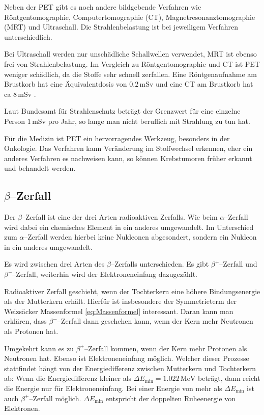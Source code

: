 \documentclass[12pt,a4paper]{scrartcl}
\numberwithin{equation}{section} %
\newcommand{\pu}[1]{\ensuremath{\mathrm{#1}}}
\begin{document}
Neben der PET gibt es noch andere bildgebende Verfahren wie Röntgentomographie, Computertomographie (CT), Magnetresonanztomographie (MRT) und Ultraschall. Die Strahlenbelastung ist bei jeweiligem Verfahren unterschiedlich.

Bei Ultraschall werden nur unschädliche Schallwellen verwendet, MRT ist ebenso frei von Strahlenbelastung. Im Vergleich zu Röntgentomographie und CT ist PET weniger schädlich, da die Stoffe sehr schnell zerfallen. Eine Röntgenaufnahme am Brustkorb hat eine Äquivalentdosis von $\pu{0.2 \,mSv}$ und eine CT am Brustkorb hat ca $\pu{8 \,mSv}$ \cite{SSK}.

Laut Bundesamt für Strahlenschutz beträgt der Grenzwert für eine einzelne Person $\pu{1 \,mSv}$ pro Jahr, so lange man nicht beruflich mit Strahlung zu tun hat.

Für die Medizin ist PET ein hervorragendes Werkzeug, besonders in der Onkologie. Das Verfahren kann Veränderung im Stoffwechsel erkennen, eher ein anderes Verfahren es nachweisen kann, so können Krebstumoren früher erkannt und behandelt werden.

\hypertarget{betazerfall}{%
\subsection{\texorpdfstring{$\beta$--Zerfall}{\textbackslash beta--Zerfall}}\label{betazerfall}}

Der $\beta$--Zerfall ist eine der drei Arten radioaktiven Zerfalls. Wie beim $\alpha$--Zerfall wird dabei ein chemisches Element in ein anderes umgewandelt. Im Unterschied zum $\alpha$--Zerfall werden hierbei keine Nukleonen abgesondert, sondern ein Nukleon in ein anderes umgewandelt.

Es wird zwischen drei Arten des $\beta$--Zerfalls unterschieden. Es gibt $\beta^+$--Zerfall und $\beta^-$--Zerfall, weiterhin wird der Elektroneneinfang dazugezählt.

Radioaktiver Zerfall geschieht, wenn der Tochterkern eine höhere Bindungsenergie als der Mutterkern erhält. Hierfür ist insbesondere der Symmetrieterm der Weizsäcker Massenformel \eqref{eq:Massenformel} interessant. Daran kann man erklären, dass $\beta^-$--Zerfall dann geschehen kann, wenn der Kern mehr Neutronen als Protonen hat.

Umgekehrt kann es zu $\beta^+$--Zerfall kommen, wenn der Kern mehr Protonen als Neutronen hat. Ebenso ist Elektroneneinfang möglich. Welcher dieser Prozesse stattfindet hängt von der Energiedifferenz zwischen Mutterkern und Tochterkern ab: Wenn die Energiedifferenz kleiner als $\Delta E_\mathrm{min}=\pu{1.022\, MeV}$ beträgt, dann reicht die Energie nur für Elektroneneinfang. Bei einer Energie von mehr als $\Delta E_\mathrm{min}$ ist auch $\beta^+$--Zerfall möglich. $\Delta E_\mathrm{min}$ entspricht der doppelten Ruheenergie von Elektronen.
\end{document}
